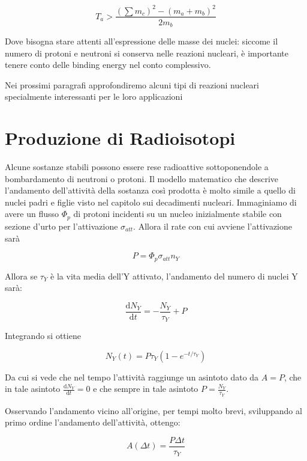 \begin{equation}
T_a>\frac{(\sum m_c)^2-(m_a+m_b)^2}{2m_b}
\end{equation}

Dove bisogna stare attenti all'espressione delle masse dei nuclei: siccome il numero di protoni e neutroni si conserva nelle reazioni nucleari, è importante tenere conto delle binding energy nel conto complessivo.

Nei prossimi paragrafi approfondiremo alcuni tipi di reazioni nucleari specialmente interessanti per le loro applicazioni 

\section{Produzione di Radioisotopi}

Alcune sostanze stabili possono essere rese radioattive sottoponendole a bombardamento di neutroni o protoni. Il modello matematico che descrive l'andamento dell'attività della sostanza così prodotta è molto simile a quello di nuclei padri e figlie visto nel capitolo sui decadimenti nucleari. 
Immaginiamo di avere un flusso $\Phi_p$ di protoni incidenti su un nucleo inizialmente stabile con sezione d'urto per l'attivazione $\sigma_{att}$. Allora il rate con cui avviene l'attivazione sarà

\begin{equation}
P=\Phi_p \sigma_{att} n_Y
\end{equation}

Allora se $\tau_Y$ è la vita media dell'Y attivato, l'andamento del numero di nuclei Y sarà:

\begin{equation}
\frac{\mathrm{d}N_Y}{\mathrm{d}t}=-\frac{N_Y}{\tau_Y}+P
\end{equation}

Integrando si ottiene

\begin{equation}
N_Y(t)=P\tau_Y(1-e^{-t/\tau_Y})
\end{equation}

Da cui si vede che nel tempo l'attività raggiunge un asintoto dato da $A=P$, che in tale asintoto $\frac{\mathrm{d}N_Y}{\mathrm{d}t}=0$ e che sempre in tale asintoto $P=\frac{N_Y}{\tau_Y}$.

Osservando l'andamento vicino all'origine, per tempi molto brevi, sviluppando al primo ordine l'andamento dell'attività, ottengo:

\begin{equation}
A(\Delta t)=\frac{P \Delta t}{\tau_Y}
\end{equation}

